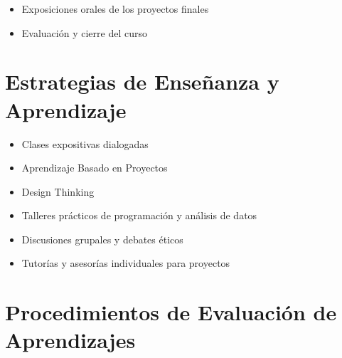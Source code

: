 \documentclass[11pt,letter,]{article}
\providecommand{\tightlist}{%
  \setlength{\itemsep}{0pt}\setlength{\parskip}{0pt}}
\begin{document}
\begin{itemize}
\tightlist
\item
  Exposiciones orales de los proyectos finales
\item
  Evaluación y cierre del curso
\end{itemize}

\hypertarget{estrategias-de-enseuxf1anza-y-aprendizaje}{%
\section{Estrategias de Enseñanza y
Aprendizaje}\label{estrategias-de-enseuxf1anza-y-aprendizaje}}

\begin{itemize}
\tightlist
\item
  Clases expositivas dialogadas
\item
  Aprendizaje Basado en Proyectos
\item
  Design Thinking
\item
  Talleres prácticos de programación y análisis de datos
\item
  Discusiones grupales y debates éticos
\item
  Tutorías y asesorías individuales para proyectos
\end{itemize}

\hypertarget{procedimientos-de-evaluaciuxf3n-de-aprendizajes}{%
\section{Procedimientos de Evaluación de
Aprendizajes}\label{procedimientos-de-evaluaciuxf3n-de-aprendizajes}}
\end{document}
